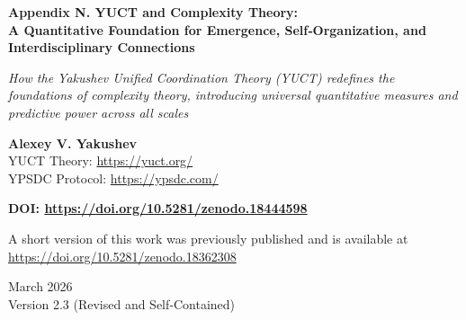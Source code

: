 \documentclass[11pt]{article}
\theoremstyle{remark}
\newcommand{\Keff}{K_{\mathrm{eff}}}
\begin{document}
	
	\begin{titlepage} 
		\centering
		\vspace*{0cm}
		{\Huge\textbf{Appendix N. YUCT and Complexity Theory: \\ A Quantitative Foundation for Emergence, Self‑Organization, and Interdisciplinary Connections}\par}
		\vspace{1.2cm}
		{\small\textit{How the Yakushev Unified Coordination Theory (YUCT) redefines the foundations of complexity theory, introducing universal quantitative measures and predictive power across all scales}}\par
		\vspace{1.2cm}
		{\small\textbf{Alexey V. Yakushev} \\}
		YUCT Theory: \url{https://yuct.org/}\\
		YPSDC Protocol: \url{https://ypsdc.com/}\par
		\vspace{2cm}
		\textbf{DOI: \url{https://doi.org/10.5281/zenodo.18444598}}\par
		\vspace{1cm}
		A short version of this work was previously published and is available at\\ \url{https://doi.org/10.5281/zenodo.18362308}\par
		\vspace{1cm}
		March 2026 \\ Version 2.3 (Revised and Self‑Contained)\par
		\newpage
		\begin{abstract}
			\noindent
			This appendix presents a systematic exposition of how the Yakushev Unified Coordination Theory (YUCT) transforms complexity theory from a set of qualitative concepts (emergence, self‑organization, power laws) into a quantitative, predictive science. Key elements: (i) coordination efficiency \(\Keff\) as a universal measure of system organization, with a unified operational definition; (ii) the fundamental error‑scaling law \(\varepsilon = \kappa_c \alpha \Keff^{-\beta}\) with exponent \(\beta = 0.67\) (derived in Appendix L and summarized here), explaining the origin of power laws across domains; (iii) the YPSDC protocol, revealing the mechanism of self‑organization through separation of dictionaries and indices; (iv) the 19‑dimensional geometry with 120 sectors and 7140 couplings \(\kappa_{sr}\) (Appendix A), providing a mathematical structure for interdisciplinary modelling; (v) a self‑contained summary of empirical validation across more than 50 orders of magnitude, from atomic bond energies to cosmic microwave background fluctuations; (vi) specific testable predictions in chemistry, biology, economics, and consciousness studies. The appendix demonstrates that the emergence of novel properties corresponds to the attainment of critical \(\Keff\) values, which can be predicted theoretically. It offers a unified language for describing complexity in physical, biological, social, and cognitive systems, and lays the groundwork for a new scientific discipline: Coordination Systemology.

\end{abstract}
\end{titlepage}
\end{document}
